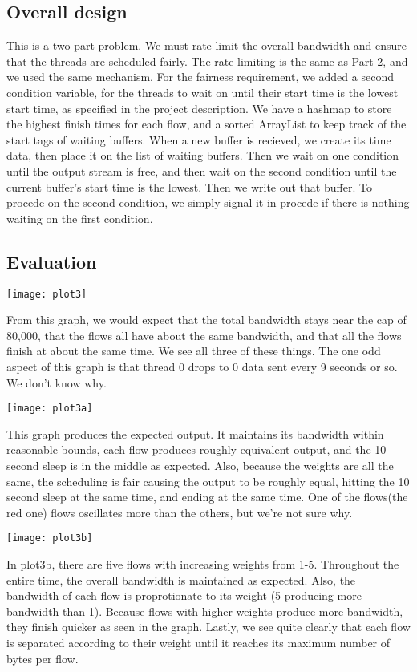 \documentclass[11pt, letterpaper]{article}
\begin{document}
\subsection{Overall design}

This is a two part problem.  We must rate limit the overall bandwidth and ensure that the threads are scheduled fairly.  The rate limiting is the same as Part 2, and we used the same mechanism.  For the 
fairness requirement, we added a second condition variable, for the threads to wait on until their start time is the lowest start time, as specified in the project description.  We have a hashmap to store the 
highest finish times for each flow, and a sorted ArrayList to keep track of the start tags of waiting buffers. When a new buffer is recieved, we create its time data, then place it on the list of waiting buffers.
Then we wait on one condition until the output stream is free, and then wait on the second condition until the current buffer's start time is the lowest.  Then we write out that buffer.  To procede on the second condition, 
we simply signal it in procede if there is nothing waiting on the first condition.

\subsection{Evaluation}

\centerline{\texttt{[image: plot3]}}

From this graph, we would expect that the total bandwidth stays near the cap of 80,000, that the flows all have about the same bandwidth, and that all the flows finish at about the same time.  We see all three of these things.  
The one odd aspect of this graph is that thread 0 drops to 0 data sent every 9 seconds or so.  We don't know why.


\centerline{\texttt{[image: plot3a]}}

This graph produces the expected output.  It maintains its bandwidth within reasonable bounds, each flow produces roughly equivalent output, and the 10 second sleep is in the middle as expected.  Also, because the weights are all the same, the scheduling is fair causing the output to be roughly equal, hitting the 10 second sleep at the same time, and ending at the same time.  One of the flows(the red one) flows oscillates more than the others, but we're not sure why.


\centerline{\texttt{[image: plot3b]}}

In plot3b, there are five flows with increasing weights from 1-5.  Throughout the entire time, the overall bandwidth is maintained as expected.  Also, the bandwidth of each flow is proprotionate to its weight (5 producing more bandwidth than 1).  Because flows with higher weights produce more bandwidth, they finish quicker as seen in the graph.  Lastly, we see quite clearly that each flow is separated according to their weight until it reaches its maximum number of bytes per flow.
\end{document}
